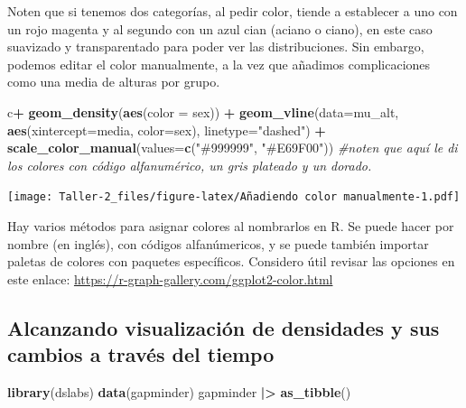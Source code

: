 \documentclass[
]{article}
\newenvironment{Shaded}{\begin{snugshade}}{\end{snugshade}}
\newcommand{\AttributeTok}[1]{\textcolor[rgb]{0.13,0.29,0.53}{#1}}
\newcommand{\CommentTok}[1]{\textcolor[rgb]{0.56,0.35,0.01}{\textit{#1}}}
\newcommand{\FunctionTok}[1]{\textcolor[rgb]{0.13,0.29,0.53}{\textbf{#1}}}
\newcommand{\NormalTok}[1]{#1}
\newcommand{\SpecialCharTok}[1]{\textcolor[rgb]{0.81,0.36,0.00}{\textbf{#1}}}
\newcommand{\StringTok}[1]{\textcolor[rgb]{0.31,0.60,0.02}{#1}}
\begin{document}
Noten que si tenemos dos categorías, al pedir color, tiende a establecer
a uno con un rojo magenta y al segundo con un azul cian (aciano o
ciano), en este caso suavizado y transparentado para poder ver las
distribuciones. Sin embargo, podemos editar el color manualmente, a la
vez que añadimos complicaciones como una media de alturas por grupo.

\begin{Shaded}
\begin{Highlighting}[]
\NormalTok{c}\SpecialCharTok{+} \FunctionTok{geom\_density}\NormalTok{(}\FunctionTok{aes}\NormalTok{(}\AttributeTok{color =}\NormalTok{ sex)) }\SpecialCharTok{+}
  \FunctionTok{geom\_vline}\NormalTok{(}\AttributeTok{data=}\NormalTok{mu\_alt, }\FunctionTok{aes}\NormalTok{(}\AttributeTok{xintercept=}\NormalTok{media, }\AttributeTok{color=}\NormalTok{sex),}
             \AttributeTok{linetype=}\StringTok{"dashed"}\NormalTok{) }\SpecialCharTok{+}
  \FunctionTok{scale\_color\_manual}\NormalTok{(}\AttributeTok{values=}\FunctionTok{c}\NormalTok{(}\StringTok{"\#999999"}\NormalTok{, }\StringTok{"\#E69F00"}\NormalTok{)) }\CommentTok{\#noten que aquí le di los colores con código alfanumérico, un gris plateado y un dorado.}
\end{Highlighting}
\end{Shaded}

\texttt{[image: Taller-2\_files/figure-latex/Añadiendo color manualmente-1.pdf]}

Hay varios métodos para asignar colores al nombrarlos en R. Se puede
hacer por nombre (en inglés), con códigos alfanúmericos, y se puede
también importar paletas de colores con paquetes específicos. Considero
útil revisar las opciones en este enlace:
\url{https://r-graph-gallery.com/ggplot2-color.html}

\subsection{Alcanzando visualización de densidades y sus cambios a
través del
tiempo}\label{alcanzando-visualizaciuxf3n-de-densidades-y-sus-cambios-a-travuxe9s-del-tiempo}

\begin{Shaded}
\begin{Highlighting}[]
\FunctionTok{library}\NormalTok{(dslabs)}
\FunctionTok{data}\NormalTok{(gapminder)}
\NormalTok{gapminder }\SpecialCharTok{|\textgreater{}} \FunctionTok{as\_tibble}\NormalTok{()}
\end{Highlighting}
\end{Shaded}
\end{document}
